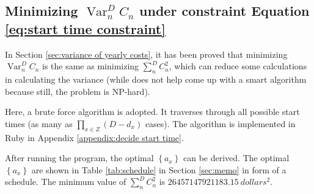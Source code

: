 \documentclass{article}
\DeclareMathOperator*{\var}{Var}
\begin{document}
\subsection{Minimizing \texorpdfstring{$\var_n^DC_n$}{varnDCn} under constraint Equation \ref{eq:start time constraint}}

In Section \ref{sec:variance of yearly costs}, it has been proved that minimizing $\var_n^DC_n$ is the same as minimizing $\sum_n^DC_n^2$,
which can reduce some calculations in calculating the variance (while does not help come up with a smart algorithm because still, the problem is NP-hard).

Here, a brute force algorithm is adopted.
It traverses through all possible start times (as many as $\prod_{x\in Z}\left(D-d_x\right)$ cases).
The algorithm is implemented in Ruby in Appendix \ref{appendix:decide start time}.

After running the program, the optimal $\left\{a_x\right\}$ can be derived.
The optimal $\left\{a_x\right\}$ are shown in Table \ref{tab:schedule} in Section \ref{sec:memo} in form of a schedule.
The minimum value of $\sum_n^DC_n^2$ is $\SI{26457147921183.15}{dollars^2}$.
\end{document}
